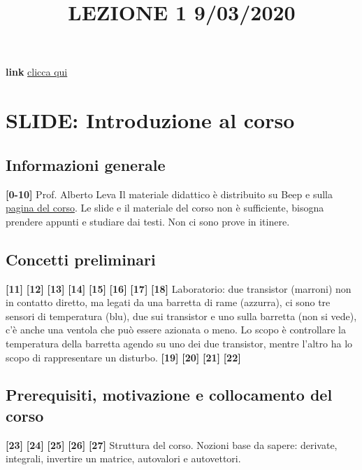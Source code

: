 \title{LEZIONE 1 9/03/2020}\newline
\textbf{link} \href{https://web.microsoftstream.com/video/6164a9b1-4d0a-4f37-a279-2e0ec1e8ca25?list=user&userId=faa91214-a6f5-40d7-8875-253fd49b8ce1}{clicca qui}
\section{SLIDE: Introduzione al corso}
\subsection{Informazioni generale}
\textbf{[0-10]}\;\newline
Prof. Alberto Leva \newline
Il materiale didattico è distribuito su Beep e sulla \href{http://home.deib.polimi.it/leva/}{pagina del corso}.\newline
Le slide e il materiale del corso non è sufficiente, bisogna prendere appunti e studiare dai testi.\newline
Non ci sono prove in itinere.
\subsection{Concetti preliminari}
\textbf{[11]}\;
\newline\textbf{[12]}\;
\newline\textbf{[13]}\;
\newline\textbf{[14]}\;
\newline\textbf{[15]}\;
\newline\textbf{[16]}\;
\newline\textbf{[17]}\;
\newline\textbf{[18]}\; Laboratorio: due transistor (marroni) non in contatto diretto, ma legati da una barretta di rame (azzurra), ci sono tre sensori di temperatura (blu), due sui transistor e uno sulla barretta (non si vede), c'è anche una ventola che può essere azionata o meno. Lo scopo è controllare la temperatura della barretta agendo su uno dei due transistor, mentre l'altro ha lo scopo di rappresentare un disturbo.
\newline\textbf{[19]}\;
\newline\textbf{[20]}\;
\newline\textbf{[21]}\;
\newline\textbf{[22]}\;
\subsection{Prerequisiti, motivazione e collocamento del corso}
\textbf{[23]}\;
\newline\textbf{[24]}\;
\newline\textbf{[25]}\;
\newline\textbf{[26]}\;
\newline\textbf{[27]}\; Struttura del corso. Nozioni base da sapere: derivate, integrali, invertire un matrice, autovalori e autovettori. 
